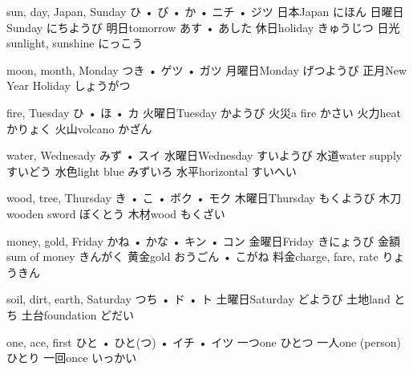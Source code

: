 



\setcounter{cardnum}{1}

		{sun, day, Japan, Sunday}
		{ひ • び • か • ニチ • ジツ}
		{日本}{Japan にほん}
		{日曜日}{Sunday にちようび}
		{明日}{tomorrow あす • あした}
		{休日}{holiday きゅうじつ}
		{日光}{sunlight, sunshine にっこう}

		{moon, month, Monday}
		{つき • ゲツ • ガツ}
		{月曜日}{Monday げつようび}
		{正月}{New Year Holiday しょうがつ}
		{}{}
		{}{}
		{}{}

		{fire, Tuesday}
		{ひ • ほ • カ}
		{火曜日}{Tuesday かようび}
		{火災}{a fire かさい}
		{火力}{heat かりょく}
		{火山}{volcano かざん}
		{}{}

		{water, Wednesady}
		{みず • スイ}
		{水曜日}{Wednesday すいようび}
		{水道}{water supply すいどう}
		{水色}{light blue みずいろ}
		{水平}{horizontal すいへい}
		{}{}

		{wood, tree, Thursday}
		{き • こ • ボク • モク}
		{木曜日}{Thursday もくようび}
		{木刀}{wooden sword ぼくとう}
		{木材}{wood もくざい}
		{}{}
		{}{}

		{money, gold, Friday}
		{かね • かな • キン • コン}
		{金曜日}{Friday きにょうび}
		{金額}{sum of money きんがく}
		{黄金}{gold おうごん • こがね}
		{料金}{charge, fare, rate りょうきん}
		{}{}

		{soil, dirt, earth, Saturday}
		{つち • ド • ト}
		{土曜日}{Saturday どようび}
		{土地}{land とち}
		{土台}{foundation どだい}
		{}{}
		{}{}

		{one, ace, first}
		{ひと • ひと(つ) • イチ • イツ}
		{一つ}{one ひとつ}
		{一人}{one (person) ひとり}
		{一回}{once いっかい}
		{}{}
		{}{}

